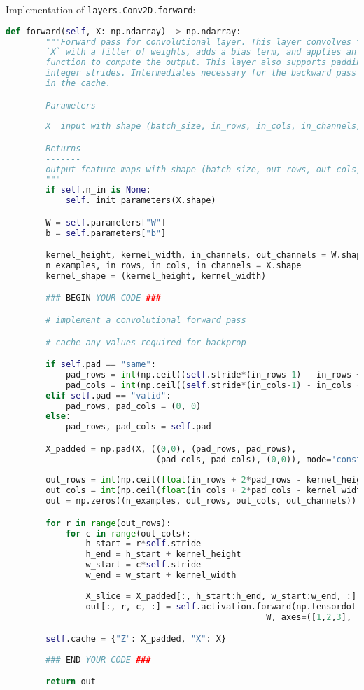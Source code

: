 Implementation of \texttt{layers.Conv2D.forward}:

\begin{lstlisting}[language=Python]
    def forward(self, X: np.ndarray) -> np.ndarray:
        """Forward pass for convolutional layer. This layer convolves the input
        `X` with a filter of weights, adds a bias term, and applies an activation
        function to compute the output. This layer also supports padding and
        integer strides. Intermediates necessary for the backward pass are stored
        in the cache.

        Parameters
        ----------
        X  input with shape (batch_size, in_rows, in_cols, in_channels)

        Returns
        -------
        output feature maps with shape (batch_size, out_rows, out_cols, out_channels)
        """
        if self.n_in is None:
            self._init_parameters(X.shape)

        W = self.parameters["W"]
        b = self.parameters["b"]

        kernel_height, kernel_width, in_channels, out_channels = W.shape
        n_examples, in_rows, in_cols, in_channels = X.shape
        kernel_shape = (kernel_height, kernel_width)

        ### BEGIN YOUR CODE ###

        # implement a convolutional forward pass

        # cache any values required for backprop

        if self.pad == "same":
            pad_rows = int(np.ceil((self.stride*(in_rows-1) - in_rows + kernel_height)/2))
            pad_cols = int(np.ceil((self.stride*(in_cols-1) - in_cols + kernel_width)/2))
        elif self.pad == "valid":
            pad_rows, pad_cols = (0, 0)
        else:
            pad_rows, pad_cols = self.pad

        X_padded = np.pad(X, ((0,0), (pad_rows, pad_rows), 
                              (pad_cols, pad_cols), (0,0)), mode='constant')
        
        out_rows = int(np.ceil(float(in_rows + 2*pad_rows - kernel_height + 1) / float(self.stride)))
        out_cols = int(np.ceil(float(in_cols + 2*pad_cols - kernel_width + 1) / float(self.stride)))
        out = np.zeros((n_examples, out_rows, out_cols, out_channels))

        for r in range(out_rows):
            for c in range(out_cols):
                h_start = r*self.stride
                h_end = h_start + kernel_height
                w_start = c*self.stride
                w_end = w_start + kernel_width
                
                X_slice = X_padded[:, h_start:h_end, w_start:w_end, :]
                out[:, r, c, :] = self.activation.forward(np.tensordot(X_slice, 
                                                    W, axes=([1,2,3], [0,1,2])) + b)

        self.cache = {"Z": X_padded, "X": X}
        
        ### END YOUR CODE ###

        return out

\end{lstlisting}

